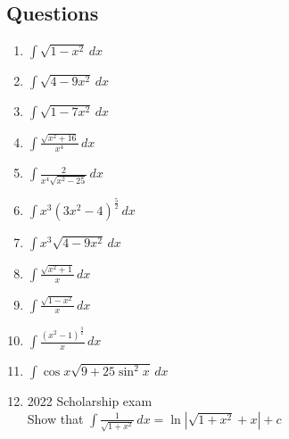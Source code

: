 \documentclass[../main.tex]{subfiles}
\begin{document}
\subsection*{Questions}
\label{Trig substitution}
\begin{enumerate}
    \item 
    \(\int \sqrt{1-x^2}\,dx\)\\

    \item 
    \(\int \sqrt{4-9x^2}\,dx\)\\

    \item 
    \(\int \sqrt{1-7x^2}\,dx\)\\

    \item 
    \(\int \frac{\sqrt{x^2+16}}{x^4}\,dx\)\\

    \item 
    \(\int \frac{2}{x^4\sqrt{x^2-25}}\,dx\)\\

    \item 
    \(\int x^3(3x^2-4)^{\frac{5}{2}}\,dx\)\\

    \item 
    \(\int x^3\sqrt{4-9x^2}\,dx\)\\

    \item 
    \(\int \frac{\sqrt{x^2+1}}{x}\,dx\)\\

    \item 
    \(\int \frac{\sqrt{1-x^2}}{x}\,dx\)\\

    \item 
    \(\int \frac{(x^2-1)^{\frac{3}{2}}}{x}\,dx\)\\

    \item 
    \(\int \cos{x}\sqrt{9+25\sin^2{x}}\,dx\)\\

    \item 2022 Scholarship exam\\
    Show that \(\int \frac{1}{\sqrt{1+x^2}}\,dx=\ln{|\sqrt{1+x^2}+x|}+c\)
    
\end{enumerate}


\pagebreak
\end{document}
